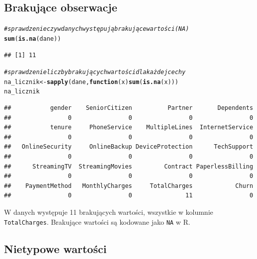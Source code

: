 \documentclass[12pt, a4paper]{article}\usepackage[]{graphicx}\usepackage[]{xcolor}
\makeatletter
\newcommand{\hlcom}[1]{\textcolor[rgb]{0.678,0.584,0.686}{\textit{#1}}}%
\newcommand{\hlstd}[1]{\textcolor[rgb]{0.345,0.345,0.345}{#1}}%
\newcommand{\hlkwa}[1]{\textcolor[rgb]{0.161,0.373,0.58}{\textbf{#1}}}%
\newcommand{\hlkwb}[1]{\textcolor[rgb]{0.69,0.353,0.396}{#1}}%
\newcommand{\hlkwc}[1]{\textcolor[rgb]{0.333,0.667,0.333}{#1}}%
\newcommand{\hlkwd}[1]{\textcolor[rgb]{0.737,0.353,0.396}{\textbf{#1}}}%
\newenvironment{kframe}{%
 \def\at@end@of@kframe{}%
 \ifinner\ifhmode%
  \def\at@end@of@kframe{\end{minipage}}%
  \begin{minipage}{\columnwidth}%
 \fi\fi%
 \def\FrameCommand##1{\hskip\@totalleftmargin \hskip-\fboxsep
 \colorbox{shadecolor}{##1}\hskip-\fboxsep
     \hskip-\linewidth \hskip-\@totalleftmargin \hskip\columnwidth}%
 \MakeFramed {\advance\hsize-\width
   \@totalleftmargin\z@ \linewidth\hsize
   \@setminipage}}%
 {\par\unskip\endMakeFramed%
 \at@end@of@kframe}
\newenvironment{knitrout}{}{} %
\makeatother
\begin{document}
\subsection{Brakujące obserwacje}
\begin{knitrout}
\color{fgcolor}\begin{kframe}
\begin{alltt}
\hlcom{# sprawdzenie czy w danych występują brakujące wartości (NA)}
\hlkwd{sum}\hlstd{(}\hlkwd{is.na}\hlstd{(dane))}
\end{alltt}
\begin{verbatim}
## [1] 11
\end{verbatim}
\begin{alltt}
\hlcom{# sprawdzenie liczby brakujących wartości dla każdej cechy}
\hlstd{na_licznik} \hlkwb{<-} \hlkwd{sapply}\hlstd{(dane,} \hlkwa{function}\hlstd{(}\hlkwc{x}\hlstd{)} \hlkwd{sum}\hlstd{(}\hlkwd{is.na}\hlstd{(x)))}
\hlstd{na_licznik}
\end{alltt}
\begin{verbatim}
##           gender    SeniorCitizen          Partner       Dependents 
##                0                0                0                0 
##           tenure     PhoneService    MultipleLines  InternetService 
##                0                0                0                0 
##   OnlineSecurity     OnlineBackup DeviceProtection      TechSupport 
##                0                0                0                0 
##      StreamingTV  StreamingMovies         Contract PaperlessBilling 
##                0                0                0                0 
##    PaymentMethod   MonthlyCharges     TotalCharges            Churn 
##                0                0               11                0
\end{verbatim}
\end{kframe}
\end{knitrout}

W danych występuje 11 brakujących wartości, wszystkie w kolumnie \texttt{TotalCharges}. Brakujące wartości są kodowane jako \texttt{NA} w R.


\subsection{Nietypowe wartości}
\end{document}
